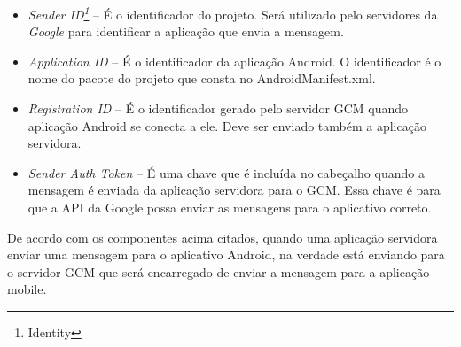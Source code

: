 \begin{itemize}
	
	\item \textit{Sender ID\footnote{Identity}} – É o identificador do projeto.
	Será utilizado pelo servidores da \textit{Google} para identificar a aplicação
	que envia a mensagem.
	
	\item \textit{Application ID} – É o identificador da aplicação Android. O
	identificador é o nome do pacote do projeto que consta no AndroidManifest.xml.
	
	\item \textit{Registration ID} – É o identificador gerado pelo servidor GCM
	quando aplicação Android se conecta a ele. Deve ser enviado também a aplicação
	servidora.
	
	\item \textit{Sender Auth Token} – É uma chave que é incluída no cabeçalho
	quando a mensagem é enviada da aplicação servidora para o GCM. Essa chave é
	para que a API da Google possa enviar as mensagens para o aplicativo correto.

\end{itemize}

	\par De acordo com os componentes acima citados, quando uma aplicação servidora
enviar uma mensagem para o aplicativo Android, na verdade está enviando para o
servidor GCM que será encarregado de enviar a mensagem para a aplicação mobile.
